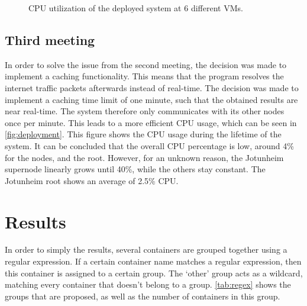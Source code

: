 \begin{figure}
    \caption{CPU utilization of the deployed system at 6 different VMs.}
    \label{fig:deployment}
\end{figure}

\subsection{Third meeting}
In order to solve the issue from the second meeting, the decision was made to implement a caching functionality. This means that the program resolves the internet traffic packets afterwards instead of real-time. The decision was made to implement a caching time limit of one minute, such that the obtained results are near real-time. The system therefore only communicates with its other nodes once per minute. This leads to a more efficient CPU usage, which can be seen in \autoref{fig:deployment}. This figure shows the CPU usage during the lifetime of the system. It can be concluded that the overall  CPU percentage is low, around 4\% for the nodes, and the root. However, for an unknown reason, the Jotunheim supernode linearly grows until 40\%, while the others stay constant. The Jotunheim root shows an average of 2.5\% CPU.

\section{Results}
In order to simply the results, several containers are grouped together using a regular expression. If a certain container name matches a regular expression, then this container is assigned to a certain group. The `other' group acts as a wildcard, matching every container that doesn't belong to a group. \autoref{tab:regex} shows the groups that are proposed, as well as the number of containers in this group.\\

